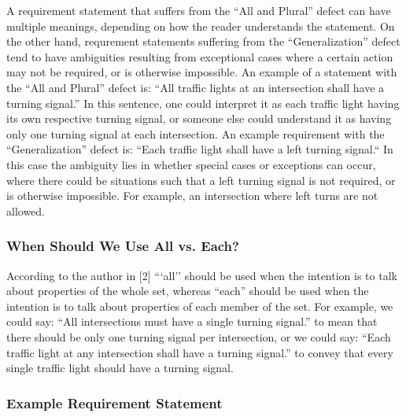 \documentclass[letterpaper,12pt]{article}
\begin{document}
A requirement statement that suffers from the ``All and Plural'' defect can have
multiple meanings, depending on how the reader understands the statement. On the
other hand, requrement statements suffering from the ``Generalization'' defect
tend to have ambiguities resulting from exceptional cases where a certain action
may not be required, or is otherwise impossible. An example of a statement with
the ``All and Plural'' defect is: ``All traffic lights at an intersection shall
have a turning signal.'' In this sentence, one could interpret it as each
traffic light having its own respective turning signal, or someone else could
understand it as having only one turning signal at each intersection. An example
requirement with the ``Generalization'' defect is: ``Each traffic light shall
have a left turning signal.`` In this case the ambiguity lies in whether special
cases or exceptions can occur, where there could be situations such that a left
turning signal is not required, or is otherwise impossible. For example, an
intersection where left turns are not allowed.

\subsubsection{When Should We Use All vs. Each?}

According to the author in [2] ```all'' should be used when the intention is to
talk about properties of the whole set, whereas ``each'' should be used when the
intention is to talk about properties of each member of the set. For example, we
could say: ``All intersections must have a single turning signal.'' to mean that
there should be only one turning signal per intersection, or we could say:
``Each traffic light at any intersection shall have a turning signal.'' to
convey that every single traffic light should have a turning signal.

\subsubsection{Example Requirement Statement}
\end{document}
